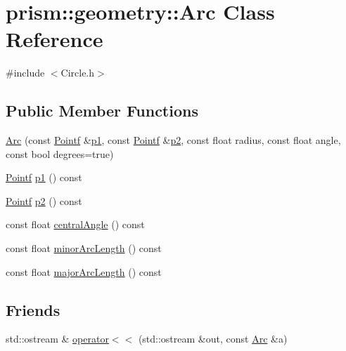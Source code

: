 \hypertarget{classprism_1_1geometry_1_1_arc}{}\section{prism\+:\+:geometry\+:\+:Arc Class Reference}
\label{classprism_1_1geometry_1_1_arc}


{\ttfamily \#include $<$Circle.\+h$>$}

\subsection*{Public Member Functions}
\begin{DoxyCompactItemize}
\item 
\hyperlink{classprism_1_1geometry_1_1_arc_ad4f2e7a4cab431593c5123549c3cf11b}{Arc} (const \hyperlink{classprism_1_1geometry_1_1_pointf}{Pointf} \&\hyperlink{classprism_1_1geometry_1_1_arc_aa8a6c835919c0095c3b5d5cc240301b4}{p1}, const \hyperlink{classprism_1_1geometry_1_1_pointf}{Pointf} \&\hyperlink{classprism_1_1geometry_1_1_arc_a8d9a86f427d2023c0257f85fec0b5aeb}{p2}, const float radius, const float angle, const bool degrees=true)
\item 
\hyperlink{classprism_1_1geometry_1_1_pointf}{Pointf} \hyperlink{classprism_1_1geometry_1_1_arc_aa8a6c835919c0095c3b5d5cc240301b4}{p1} () const 
\item 
\hyperlink{classprism_1_1geometry_1_1_pointf}{Pointf} \hyperlink{classprism_1_1geometry_1_1_arc_a8d9a86f427d2023c0257f85fec0b5aeb}{p2} () const 
\item 
const float \hyperlink{classprism_1_1geometry_1_1_arc_a0ddf0ec519ee11325a39e4e7e99292b2}{central\+Angle} () const 
\item 
const float \hyperlink{classprism_1_1geometry_1_1_arc_a354e04f2243a661dfe9b243ccb7bde92}{minor\+Arc\+Length} () const 
\item 
const float \hyperlink{classprism_1_1geometry_1_1_arc_a1abba26697a90911e9cb2d543e365d58}{major\+Arc\+Length} () const 
\end{DoxyCompactItemize}
\subsection*{Friends}
\begin{DoxyCompactItemize}
\item 
std\+::ostream \& \hyperlink{classprism_1_1geometry_1_1_arc_a50240c380cbf90a2a0ae3288f74120c2}{operator$<$$<$} (std\+::ostream \&out, const \hyperlink{classprism_1_1geometry_1_1_arc}{Arc} \&a)
\end{DoxyCompactItemize}


